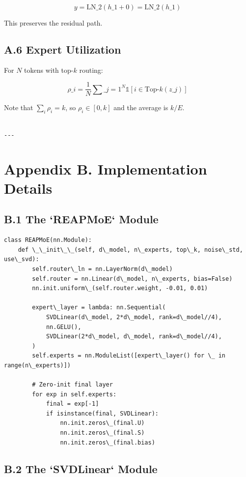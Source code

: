 \[
y = \text{LN}\_2(h\_1 + 0) = \text{LN}\_2(h\_1)
\]

This preserves the residual path.

\subsection{A.6 Expert Utilization}

For $N$ tokens with top-$k$ routing:

\[
\rho\_i = \frac{1}{N} \sum\_{j=1}^{N} \mathbb{1}[i \in \text{Top-}k(z\_j)]
\]

Note that $\sum_i \rho_i = k$, so $\rho_i \in [0, k]$ and the average is 
$k / E$.
\begin{lstlisting}

---
\end{lstlisting}

\section{Appendix B. Implementation Details}

\subsection{B.1 The `REAPMoE` Module}

\begin{lstlisting}
class REAPMoE(nn.Module):
    def \_\_init\_\_(self, d\_model, n\_experts, top\_k, noise\_std, use\_svd):
        self.router\_ln = nn.LayerNorm(d\_model)
        self.router = nn.Linear(d\_model, n\_experts, bias=False)
        nn.init.uniform\_(self.router.weight, -0.01, 0.01)
        
        expert\_layer = lambda: nn.Sequential(
            SVDLinear(d\_model, 2*d\_model, rank=d\_model//4),
            nn.GELU(),
            SVDLinear(2*d\_model, d\_model, rank=d\_model//4),
        )
        self.experts = nn.ModuleList([expert\_layer() for \_ in range(n\_experts)])
        
        # Zero-init final layer
        for exp in self.experts:
            final = exp[-1]
            if isinstance(final, SVDLinear):
                nn.init.zeros\_(final.U)
                nn.init.zeros\_(final.S)
                nn.init.zeros\_(final.bias)
\end{lstlisting}

\subsection{B.2 The `SVDLinear` Module}

